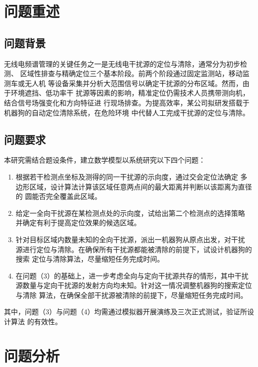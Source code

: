 \documentclass[withoutpreface,bwprint]{cumcmthesis} %
\begin{document}


\section{问题重述}

\subsection{问题背景}

无线电频谱管理的关键任务之一是无线电干扰源的定位与清除，通常分为初步检测、
区域性排查与精确定位三个基本阶段。前两个阶段通过固定监测站，移动监测车或无人机
等设备采集并分析大范围信号以确定干扰源的分布区域。然而，由于环境遮挡、低功率干
扰源等因素的影响，精准定位仍需技术人员携带测向机，结合信号场强变化和方向特征进
行现场排查。为提高效率，某公司拟研发搭载于机器狗的自动定位清除系统，在危险环境
中代替人工完成干扰源的定位与清除。

\subsection{问题要求}

本研究需结合题设条件，建立数学模型以系统研究以下四个问题：

\begin{enumerate}[leftmargin=1.45cm]
    \item 根据若干检测点坐标及测得的同一干扰源的示向度，通过交会定位法确定
    多边形区域，设计算法计算该区域任意两点间的最大距离并判断以该距离为直径的
    圆能否完全覆盖此区域。
    \item 给定一全向干扰源在某检测点处的示向度，试给出第二个检测点的选择策略
    并确定有利于提高定位效果的候选区域。
    \item 针对目标区域内数量未知的全向干扰源，派出一机器狗从原点出发，对干扰
    源进行定位与清除。在确保所有干扰源都能被清除的前提下，试设计机器狗的搜索
    定位与清除算法，尽量缩短任务完成时间。
    \item 在问题（3）的基础上，进一步考虑全向与定向干扰源共存的情形，其中干扰
    源数量与定向干扰源的发射方向均未知。针对这一情况调整机器狗的搜索定位与清除
    算法，在确保全部干扰源被清除的前提下，尽量缩短任务完成时间。

\end{enumerate}

其中，问题（3）与问题（4）均需通过模拟器开展演练及三次正式测试，验证所设计算法
的有效性。

\section{问题分析}
\end{document}
